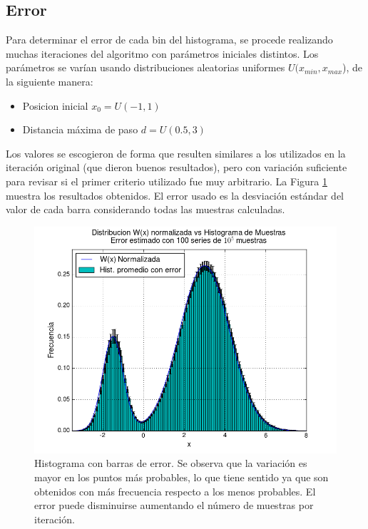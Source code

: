 \documentclass{article}
\begin{document}
\subsection{Error}

Para determinar el error de cada bin del histograma, se procede realizando muchas iteraciones del algoritmo con parámetros iniciales distintos. Los parámetros se varían usando distribuciones aleatorias uniformes $U(x_{min}, x_{max}$), de la siguiente manera:

\begin{itemize}
  \item Posicion inicial $ x_0 = U(-1 , 1) $ 
  
  \item Distancia máxima de paso $ d = U(0.5, 3) $
\end{itemize}

Los valores se escogieron de forma que resulten similares a los utilizados en la iteración original (que dieron buenos resultados), pero con variación suficiente para revisar si el primer criterio utilizado fue muy arbitrario. La Figura \ref{fig:bonus} muestra los resultados obtenidos. El error usado es la desviación estándar del valor de cada barra considerando todas las muestras calculadas.

\begin{figure}[ht]
  \centering
  \includegraphics[scale = 0.65]{images/bonus_P2.png}
  \caption{Histograma con barras de error. Se observa que la variación es mayor en los puntos más probables, lo que tiene sentido ya que son obtenidos con más frecuencia respecto a los menos probables. El error puede disminuirse aumentando el número de muestras por iteración.}
  \label{fig:bonus}
\end{figure}
\end{document}
